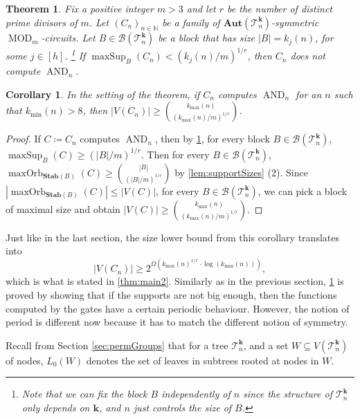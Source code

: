 \documentclass[11pt]{article}
\DeclareMathOperator{\supp}{sup}
\DeclareMathOperator{\MOD}{MOD}
\DeclareMathOperator{\AND}{AND}
\DeclareMathOperator{\maxSup}{maxSup}
\newcommand{\Aut}{\mathbf{Aut}}
\newcommand{\Stab}{\mathbf{Stab}}
\newcommand{\bbN}{\mathbb{N}}
\newcommand{\Bb}{{\mathcal B}}
\newcommand{\Tt}{{\mathcal T}}
\theoremstyle{definition}
\theoremstyle{plain}
\newtheorem{corollary}[definition]{Corollary}
\newtheorem{theorem}[definition]{Theorem}
\theoremstyle{remark}
\theoremstyle{remark}
\newcommand{\maxorb}{\operatorname{maxOrb}}
\newcommand{\maxsup}{\operatorname{maxSup}}
\begin{document}
\begin{theorem}
	\label{thm:mainSupportLowerBoundNested}
	Fix a positive integer $m > 3$ and let $r$ be the number of distinct prime divisors of $m$.
	Let $(C_n)_{n \in \bbN}$ be a family of $\Aut(\Tt_n^{\boldsymbol{k}})$-symmetric $\MOD_m$-circuits. 
	Let $B \in \Bb(\Tt_n^{\boldsymbol{k}})$ be a block that has size $|B| = k_j(n)$, for some $j \in [h]$. \footnote{ Note that we can fix the block $B$ independently of $n$ since the structure of $\Tt_n^{\boldsymbol{k}}$ only depends on $\boldsymbol{k}$, and $n$ just controls the size of $B$.} If $\maxSup_{B}(C_n) < (k_j(n)/m)^{1/r}$, then $C_n$ does not compute $\AND_n$.
\end{theorem}


\begin{corollary}
	\label{cor:sizeLowerBoundNested}
	In the setting of the theorem,
	if $C_n$ computes $\AND_n$ for an $n$ such that $k_{\text{min}}(n) > 8$, then
	$|V(C_n)| \geq \binom{k_{\text{max}}(n)}{(k_{\text{max}}(n)/m)^{1/r}}$.
\end{corollary}
\begin{proof}
	If $C \coloneqq C_n$ computes $\AND_n$, then by \cref{thm:mainSupportLowerBoundNested},
	for every block $B \in \Bb(\Tt_n^{\boldsymbol{k}})$, $\maxsup_B(C) \geq (|B|/m)^{1/r}$.
	Then for every $B \in \Bb(\Tt_n^{\boldsymbol{k}})$, $\maxorb_{\Stab(B)}(C) \geq \binom{|B|}{ (|B|/m)^{1/r} }$ by \cref{lem:supportSizes} (2). 
	Since $|\maxorb_{\Stab(B)}(C)| \leq |V(C)|$, for every $B \in  \Bb(\Tt_n^{\boldsymbol{k}})$, we can pick a block of maximal size and obtain $|V(C)| \geq \binom{k_{\text{max}}(n)}{(k_{\text{max}}(n)/m)^{1/r}}$.
\end{proof}	
Just like in the last section, the size lower bound from this corollary translates into
\[
|V(C_n)| \geq 2^{\Omega(k_{\text{max}}(n)^{1/r} \cdot \log(k_{\text{max}}(n)) )},
\]
which is what is stated in \cref{thm:main2}.
Similarly as in the previous section, \cref{thm:mainSupportLowerBoundNested} is proved by showing that if the supports are not big enough, then the functions computed by the gates have a certain periodic behaviour. However, the notion of period is different now because it has to match the different notion of symmetry. 

Recall from Section \ref{sec:permGroups} that for a tree $\Tt^{\boldsymbol{k}}_n$, and a set $W \subseteq V(\Tt^{\boldsymbol{k}}_n)$ of nodes, $L_0(W)$ denotes the set of leaves in subtrees rooted at nodes in $W$.
\end{document}
